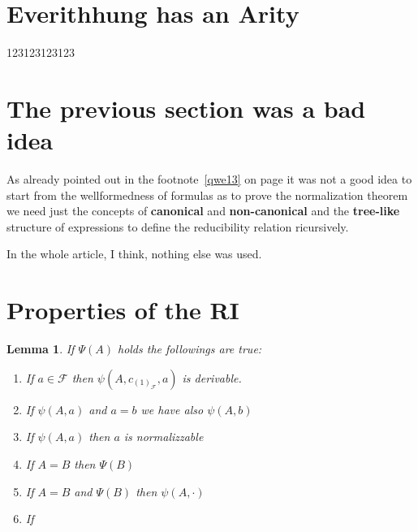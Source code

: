 \documentclass[11pt,a5paper,draft,oneside]{amsbook}
\theoremstyle{plain}%
\newtheorem{lem}[thm]{Lemma}
\theoremstyle{definition}
\theoremstyle{remark}
\newcommand{\ps}[3][]{\psi\left(#2,#3\right)}
\newcommand{\femph}{\textbf}
\begin{document}
	\section{Everithhung has an Arity} 
		123123123123
	\section{The previous section was a bad idea}
		As already pointed out in the footnote~\ref{qwe13} on page \pageref{qwe13} it was not a good idea to start from the wellformedness of formulas as to prove the normalization theorem we need just the concepts of \femph{canonical} 
		and \femph{non-canonical} and the \femph{tree-like} structure of expressions to define the reducibility relation ricursively.
		
		In the whole article, I think, nothing else was used.
		\newpage
\section{Properties of the RI}
	\begin{lem}
	If $\Psi(A)$ holds the followings are true:
	\begin{enumerate}
		\item If $a \in \mathcal{F}$ then $\psi(A,c_{(1)_\mathcal{F}},a)$ is derivable.
		\item If $\ps{A}{a}$ and \(a = b\) we have also  $\ps{A}{b}$
		\item If  $\ps{A}{a}$ then $a$ is normalizzable
		\item If $A=B$ then $\Psi(B)$
		\item If $A=B$ and $\Psi(B)$ then $\ps{A}{\cdot} $
		\item If 
	\end{enumerate}
	\end{lem}
	
	
	
	
	
	
	
	
	
	
	
	
	
	
\end{document}
